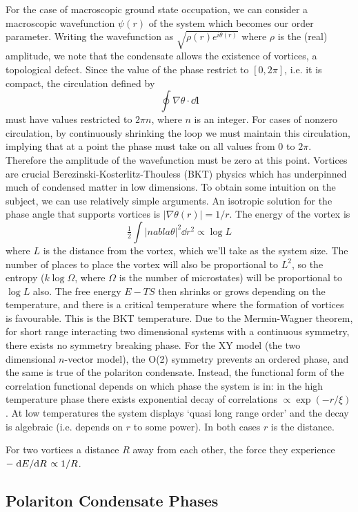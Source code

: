 \documentclass[letterpaper, 10 pt, conference]{IEEEtran}  %
\newcommand{\myvec}[1]{\boldsymbol{#1}}
\begin{document}
For the case of macroscopic ground state occupation, we can consider a macroscopic wavefunction $\psi(r)$ of the system which becomes our order parameter. 
Writing the wavefunction as $\sqrt{\rho(r) e^{i \theta (r)}}$ where $\rho$ is the (real) amplitude, we note that the condensate allows the existence of vortices, a topological defect. 
Since the value of the phase restrict to $[0, 2 \pi]$, i.e. it is compact, the circulation defined by 
\[
\oint \nabla \theta \cdot \dd{\myvec{l}} 
\]
must have values restricted to $2\pi n$, where $n$ is an integer. 
For cases of nonzero circulation, by continuously shrinking the loop we must maintain this circulation, implying that at a point the phase must take on all values from 0 to $2\pi$. 
Therefore the amplitude of the wavefunction must be zero at this point.
Vortices are crucial Berezinski-Kosterlitz-Thouless (BKT) physics which has underpinned much of condensed matter in low dimensions. 
To obtain some intuition on the subject, we can use relatively simple arguments.
An isotropic solution for the phase angle that supports vortices is $|\nabla \theta(r)| =1/r$. 
The energy of the vortex is
\[
\tfrac12 \int |nabla \theta |^2 \dd r^2 \propto \log L
\]
where $L$ is the distance from the vortex, which we'll take as the system size. 
The number of places to place the vortex will also be proportional to $L^2$, so the entropy ($k \log \Omega$, where $\Omega$ is the number of microstates) will be proportional to $\log L$ also. 
The free energy $E - TS$ then shrinks or grows depending on the temperature, and there is a critical temperature where the formation of vortices is favourable. 
This is the BKT temperature. 
Due to the Mermin-Wagner theorem, for short range interacting two dimensional systems with a continuous symmetry, there exists no symmetry breaking phase. 
For the XY model (the two dimensional $n$-vector model), the O(2) symmetry prevents an ordered phase, and the same is true of the polariton condensate. 
Instead, the functional form of the correlation functional depends on which phase the system is in: in the high temperature phase there exists exponential decay of correlations $\propto \exp (-r / \xi)$. 
At low temperatures the system displays `quasi long range order' and the decay is algebraic (i.e. depends on $r$ to some power).
In both cases $r$ is the distance. 
 
For two vortices a distance $R$ away from each other, the force they experience $-\dv*{E}{R} \propto 1/R$. 

\subsection{Polariton Condensate Phases}
\end{document}
